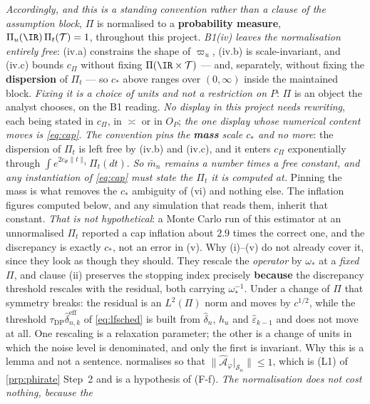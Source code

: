 \begin{lemma}
\emph{Accordingly, and this is a standing convention rather than a clause of the assumption block},
$\Pi$ is normalised to a \textbf{probability measure}, $\Pi_u(\IR)\,\Pi_t(\mathcal T)=1$, throughout this
project. \emph{B1(iv) leaves the normalisation entirely free}: (iv.a) constrains the shape of $\varpi_u$,
(iv.b) is scale-invariant, and (iv.c) bounds $c_\Pi$ without fixing $\Pi(\IR\times\mathcal T)$ --- and,
separately, without fixing the \textbf{dispersion} of $\Pi_t$ --- so
$c_\ast$
above ranges over $(0,\infty)$ inside the maintained block. \emph{Fixing it is a choice of units and not a
restriction on $P$}: $\Pi$ is an object the analyst chooses, on the B1 reading. \emph{No display in this
project needs rewriting}, each being stated in $c_\Pi$, in $\asymp$ or in $O_P$; \emph{the one display
whose numerical content moves is \eqref{eq:cap}}. \emph{The convention pins the \textbf{mass} scale
$c_\ast$ and no more}: the dispersion of $\Pi_t$ is left free by \textup{(iv.b)} and \textup{(iv.c)},
and it enters $c_\Pi$ exponentially through $\int e^{2c_\Phi\|t\|_1}\Pi_t(dt)$. \emph{So $\bar m_n$
remains a number times a free constant, and any instantiation of \eqref{eq:cap} must state the $\Pi_t$
it is computed at.} Pinning the mass is what removes the $c_\ast$ ambiguity of \textup{(vi)} and
nothing else. The inflation figures computed below, and any
simulation that reads them, inherit that constant. \emph{That is not hypothetical}: a Monte Carlo run
of this estimator at an unnormalised $\Pi_t$ reported a cap inflation about $2.9$ times the correct one,
and the discrepancy is exactly $c_\ast$, not an error in \textup{(v)}.
Why \textup{(i)}--\textup{(v)} do not already cover it, since they look as though they should. They
rescale the \emph{operator} by $\omega_\ast$ at a \emph{fixed} $\Pi$, and clause (ii) preserves the
stopping index precisely \textbf{because} the discrepancy threshold rescales with the residual, both
carrying $\omega_\ast^{-1}$. Under a change of $\Pi$ that symmetry breaks: the residual is an $L^{2}(\Pi)$
norm and moves by $c^{1/2}$, while the threshold $\tau_{\mathrm{DP}}\hat\delta^{\mathrm{eff}}_{n,k}$ of
\eqref{eq:lfsched} is built from $\hat\delta_n$, $h_u$ and $\hat\varepsilon_{k-1}$ and does not move at
all. One rescaling is a relaxation parameter; the other is a change of units in which the noise
level is denominated, and only the first is invariant.
Why this is a lemma and not a sentence.  normalises so that
$\|\hat{\mathcal A}_\varphi\vert_{\mathcal S_n}\|\le1$, which is (L1) of \cref{prp:phirate} Step~2 and
is a hypothesis of (F-f). \emph{The normalisation does not cost nothing, because the
}
\end{lemma}
